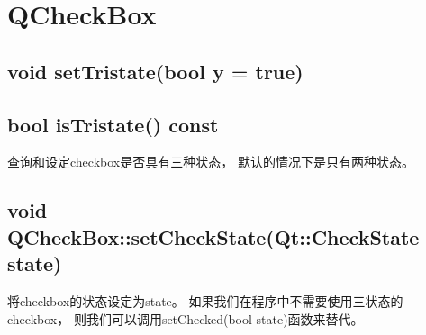 \chapter{QCheckBox}
\section{void 	setTristate(bool y = true)}
\section{bool 	isTristate() const}
查询和设定checkbox是否具有三种状态，%
默认的情况下是只有两种状态。%

\section{void QCheckBox::setCheckState(Qt::CheckState state)}
将checkbox的状态设定为state。%
如果我们在程序中不需要使用三状态的checkbox，%
则我们可以调用setChecked(bool state)函数来替代。%
